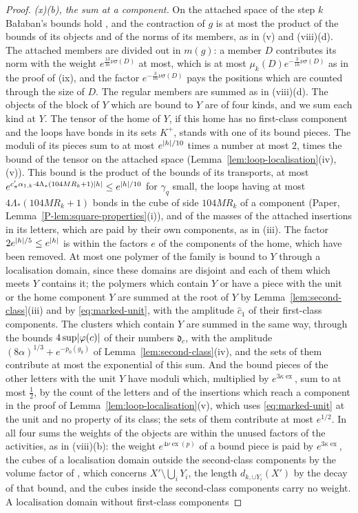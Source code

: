 \documentclass[11pt]{preprint}
\DeclarePairedDelimiter{\abs}{\lvert}{\rvert}
\numberwithin{equation}{section}
\theoremstyle{definition}
\theoremstyle{remark}
\theoremstyle{plain}
\begin{document}
\begin{proof}
\emph{(x)(b), the sum at a component.} On the attached space of the step $k$ Ba{\l}aban's bounds hold \cite[(1.73)--(1.75), p.~380]{BalabanLFR2}, and the contraction of $g$ is at most the product of the bounds of its objects and of the norms of its members, as in (v) and (viii)(d). The attached members are divided out in $m(g)$: a member $D$ contributes its norm with the weight $e^{\frac{13}{16}\nu\sigma(D)}$ at most, which is at most $\mu_k(D)e^{-\frac{3}{16}\nu\sigma(D)}$ as in the proof of (ix), and the factor $e^{-\frac{3}{16}\nu\sigma(D)}$ pays the positions which are counted through the size of $D$. The regular members are summed as in (viii)(d). The objects of the block of $Y$ which are bound to $Y$ are of four kinds, and we sum each kind at $Y$. The tensor of the home of $Y$, if this home has no first-class component and the loops have bonds in its sets $K^+$, stands with one of its bound pieces. The moduli of its pieces sum to at most $e^{\abs h/10}$ times a number at most $2$, times the bound of the tensor on the attached space (Lemma~\ref{lem:loop-localisation}(iv), (v)). This bound is the product of the bounds of its transports, at most $e^{c'_\pi\alpha_{1,k} \cdot 4\Lambda_*(104MR_k + 1)\abs h} \leq e^{\abs h/10}$ for $\gamma_q$ small, the loops having at most $4\Lambda_*(104MR_k + 1)$ bonds in the cube of side $104MR_k$ of a component (Paper, Lemma~\ref{P-lem:square-properties}(i)), and of the masses of the attached insertions in its letters, which are paid by their own components, as in (iii). The factor $2e^{\abs h/5} \leq e^{\abs h}$ is within the factors $e$ of the components of the home, which have been removed. At most one polymer of the family is bound to $Y$ through a localisation domain, since these domains are disjoint and each of them which meets $Y$ contains it; the polymers which contain $Y$ or have a piece with the unit or the home component $Y$ are summed at the root of $Y$ by Lemma~\ref{lem:second-class}(iii) and by \eqref{eq:marked-unit}, with the amplitude $\hat c_1$ of their first-class components. The clusters which contain $Y$ are summed in the same way, through the bounds $4\sup\abs{\varphi(c)}$ of their numbers $\mathfrak d_c$, with the amplitude $(8\alpha)^{1/3} + e^{-p_0(g_k)}$ of Lemma~\ref{lem:second-class}(iv), and the sets of them contribute at most the exponential of this sum. And the bound pieces of the other letters with the unit $Y$ have moduli which, multiplied by $e^{3\kappa\operatorname{ex}}$, sum to at most $\frac12$, by the count of the letters and of the insertions which reach a component in the proof of Lemma~\ref{lem:loop-localisation}(v), which uses \eqref{eq:marked-unit} at the unit and no property of its class; the sets of them contribute at most $e^{1/2}$. In all four sums the weights of the objects are within the unused factors of the activities, as in (viii)(b): the weight $e^{4\nu\operatorname{ex}(p)}$ of a bound piece is paid by $e^{3\kappa\operatorname{ex}}$, the cubes of a localisation domain outside the second-class components by the volume factor of \cite[(1.95)]{BalabanLFR2}, which concerns $X' \setminus \bigcup_iY_i$, the length $d_{k,\cup Y_i}(X')$ by the decay of that bound, and the cubes inside the second-class components carry no weight. A localisation domain without first-class components 
\end{proof}
\end{document}
